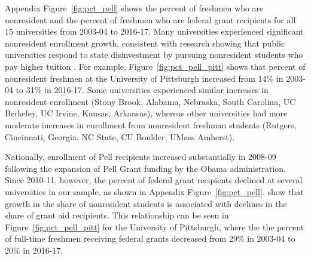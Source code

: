 \documentclass[twoside]{article}
\begin{document}
Appendix Figure~\ref{fig:pct_pell} shows the percent of freshmen who are nonresident and the percent of freshmen who are federal grant recipients for all 15 universities from 2003-04 to 2016-17. Many universities experienced significant nonresident enrollment growth, consistent with research showing that public universities respond to state disinvestment by pursuing nonresident students who pay higher tuition \citep{RN3753}. For example, Figure~\ref{fig:pct_pell_pitt} shows that percent of nonresident freshmen at the University of Pittsburgh increased from 14\% in 2003-04 to 31\% in 2016-17. Some universities experienced similar increases in nonresident enrollment (Stony Brook, Alabama, Nebraska, South Carolina, UC Berkeley, UC Irvine, Kansas, Arkansas), whereas other universities had more moderate increases in enrollment from nonresident freshman students (Rutgers, Cincinnati, Georgia, NC State, CU Boulder, UMass Amherst).


Nationally, enrollment of Pell recipients increased substantially in 2008-09 following the expansion of Pell Grant funding by the Obama administration. Since 2010-11, however, the percent of federal grant recipients declined at several universities in our sample, as shown in Appendix Figure~\ref{fig:pct_pell}. \cite{RN3685} show that growth in the share of nonresident students is associated with declines in the share of grant aid recipients. This relationship can be seen in Figure~\ref{fig:pct_pell_pitt} for the University of Pittsburgh, where the the percent of full-time freshmen receiving federal grants decreased from 29\% in 2003-04 to 20\% in 2016-17.
\end{document}
